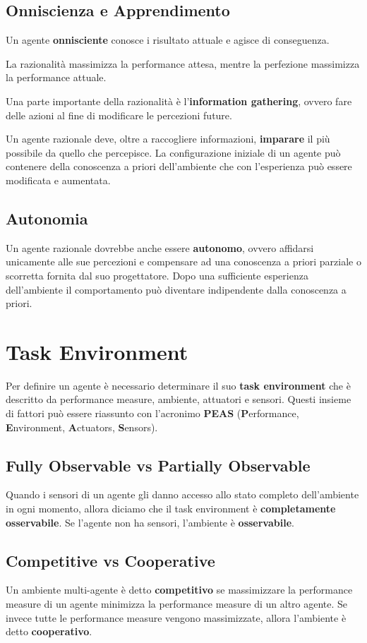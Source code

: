 \subsection{Onniscienza e Apprendimento}
Un agente \textbf{onnisciente} conosce i risultato attuale e agisce di conseguenza.

La razionalità massimizza la performance attesa, mentre la perfezione massimizza la performance attuale.

Una parte importante della razionalità è l'\textbf{information gathering}, ovvero fare delle azioni al fine di modificare le percezioni future.

Un agente razionale deve, oltre a raccogliere informazioni, \textbf{imparare} il più possibile da quello che percepisce. 
La configurazione iniziale di un agente può contenere della conoscenza a priori dell'ambiente che con l'esperienza può essere modificata e aumentata.

\subsection{Autonomia}
Un agente razionale dovrebbe anche essere \textbf{autonomo}, ovvero affidarsi unicamente alle sue percezioni e compensare ad una conoscenza a priori parziale o scorretta fornita 
dal suo progettatore. Dopo una sufficiente esperienza dell'ambiente il comportamento può diventare indipendente dalla conoscenza a priori. 

\section{Task Environment}
Per definire un agente è necessario determinare il suo \textbf{task environment} che è descritto da 
performance measure, ambiente, attuatori e sensori. 
Questi insieme di fattori può essere riassunto con l'acronimo \textbf{PEAS} (\textbf{P}erformance, \textbf{E}nvironment, \textbf{A}ctuators, \textbf{S}ensors).

\subsection*{Fully Observable vs Partially Observable}
Quando i sensori di un agente gli danno accesso allo stato completo 
dell'ambiente in ogni momento, allora diciamo che il task environment
è \textbf{completamente osservabile}. Se l'agente non ha sensori, l'ambiente è \textbf{osservabile}.

\subsection*{Competitive vs Cooperative}
Un ambiente multi-agente è detto \textbf{competitivo} se massimizzare la performance measure di un agente
minimizza la performance measure di un altro agente. Se invece tutte le performance measure vengono
massimizzate, allora l'ambiente è detto \textbf{cooperativo}. 

